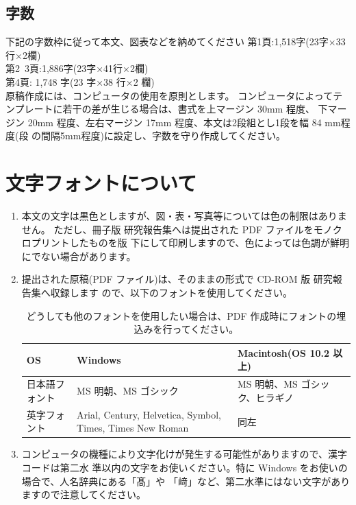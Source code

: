 \documentclass[base=11pt,magstyle=real,a4paper,twocolumn,xelatex,pandoc,jafont=ms]{bxjsarticle}
\begin{document}
	\subsection{字数}
	下記の字数枠に従って本文、図表などを納めてください	
	第1頁:1,518字(23字×33行×2欄) \\
	第2~3頁:1,886字(23字×41行×2欄) \\
	第4頁: 1,748 字(23 字×38 行×2 欄)\\
	原稿作成には、コンピュータの使用を原則とします。 コンピュータによってテンプレートに若干の差が生じる場合は、書式を上マージン 30mm 程度、 下マージン 20mm 程度、左右マージン 17mm 程度、本文は2段組とし1段を幅 84 mm程度(段 の間隔5mm程度)に設定し、字数を守り作成してください。
\section{文字フォントについて}
	\begin{enumerate}
		\item 本文の文字は黒色としますが、図・表・写真等については色の制限はありません。
		ただし、冊子版 研究報告集へは提出された PDF ファイルをモノクロプリントしたものを版
		下にして印刷しますので、色によっては色調が鮮明にでない場合があります。
		\item 提出された原稿(PDF ファイル)は、そのままの形式で CD-ROM 版 研究報告集へ収録します
		ので、以下のフォントを使用してください。
		\begin{table}[bhp]
			\centering
			\begin{tabular}{l|p{16\zw}p{16\zw}}
				OS & Windows & Macintosh(OS 10.2 以上)\\ \hline
				日本語フォント & MS 明朝、MS ゴシック &  MS 明朝、MS ゴシック、ヒラギノ\\
				英字フォント & Arial, Century, Helvetica, Symbol, Times, Times New Roman & 同左
			\end{tabular}
			\caption{どうしても他のフォントを使用したい場合は、PDF 作成時にフォントの埋込みを行ってください。}
		\end{table}
		\item コンピュータの機種により文字化けが発生する可能性がありますので、漢字コードは第二水 準以内の文字をお使いください。特に Windows をお使いの場合で、人名辞典にある「髙」や 「﨑」など、第二水準にはない文字がありますので注意してください。
	\end{enumerate}
	
\end{document}
